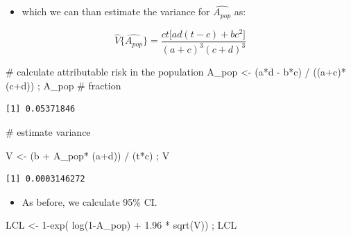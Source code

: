 \documentclass[
  letterpaper,
  DIV=11,
  numbers=noendperiod]{scrartcl}
\newenvironment{Shaded}{\begin{snugshade}}{\end{snugshade}}
\newcommand{\CommentTok}[1]{\textcolor[rgb]{0.37,0.37,0.37}{#1}}
\newcommand{\DecValTok}[1]{\textcolor[rgb]{0.68,0.00,0.00}{#1}}
\newcommand{\FloatTok}[1]{\textcolor[rgb]{0.68,0.00,0.00}{#1}}
\newcommand{\FunctionTok}[1]{\textcolor[rgb]{0.28,0.35,0.67}{#1}}
\newcommand{\NormalTok}[1]{\textcolor[rgb]{0.00,0.23,0.31}{#1}}
\newcommand{\OtherTok}[1]{\textcolor[rgb]{0.00,0.23,0.31}{#1}}
\newcommand{\SpecialCharTok}[1]{\textcolor[rgb]{0.37,0.37,0.37}{#1}}
\providecommand{\tightlist}{%
  \setlength{\itemsep}{0pt}\setlength{\parskip}{0pt}}\usepackage{longtable,booktabs,array}
\begin{document}
\begin{itemize}
\tightlist
\item
  which we can than estimate the variance for \(\hat{A_{pop}}\) as:
\end{itemize}

\[
\hat{V} \bigl\{ \hat{A_{pop}}  \bigl\} = \frac{
ct \bigr[ad(t-c) + bc^2 \bigr]}
{(a+c)^3(c+d)^3}
\]

\begin{Shaded}
\begin{Highlighting}[]
\CommentTok{\# calculate attributable risk in the population}
\NormalTok{A\_pop }\OtherTok{\textless{}{-}}\NormalTok{ (a}\SpecialCharTok{*}\NormalTok{d }\SpecialCharTok{{-}}\NormalTok{ b}\SpecialCharTok{*}\NormalTok{c) }\SpecialCharTok{/}\NormalTok{ ((a}\SpecialCharTok{+}\NormalTok{c)}\SpecialCharTok{*}\NormalTok{ (c}\SpecialCharTok{+}\NormalTok{d)) ; A\_pop }\CommentTok{\# fraction}
\end{Highlighting}
\end{Shaded}

\begin{verbatim}
[1] 0.05371846
\end{verbatim}

\begin{Shaded}
\begin{Highlighting}[]
\CommentTok{\# estimate variance}

\NormalTok{V }\OtherTok{\textless{}{-}}\NormalTok{ (b }\SpecialCharTok{+}\NormalTok{ A\_pop}\SpecialCharTok{*}\NormalTok{ (a}\SpecialCharTok{+}\NormalTok{d)) }\SpecialCharTok{/}\NormalTok{ (t}\SpecialCharTok{*}\NormalTok{c) ;  V}
\end{Highlighting}
\end{Shaded}

\begin{verbatim}
[1] 0.0003146272
\end{verbatim}

\begin{itemize}
\tightlist
\item
  As before, we calculate 95\% CI.
\end{itemize}

\begin{Shaded}
\begin{Highlighting}[]
\NormalTok{LCL }\OtherTok{\textless{}{-}}  \DecValTok{1}\SpecialCharTok{{-}}\FunctionTok{exp}\NormalTok{( }\FunctionTok{log}\NormalTok{(}\DecValTok{1}\SpecialCharTok{{-}}\NormalTok{A\_pop) }\SpecialCharTok{+} \FloatTok{1.96} \SpecialCharTok{*} \FunctionTok{sqrt}\NormalTok{(V))  ; LCL}
\end{Highlighting}
\end{Shaded}
\end{document}
